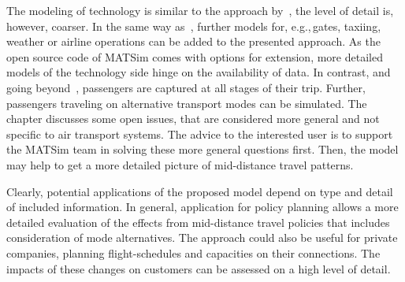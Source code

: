 The modeling of technology is similar to the approach by~\citet{ClarkeEtAl2007AirNetworkSim}, the level of detail is, however, coarser. 
In the same way as~\citet{ClarkeEtAl2007AirNetworkSim}, further models for, e.g.,\,gates, taxiing, weather or airline operations can be added to the presented approach. 
As the open source code of MATSim comes with options for extension, more detailed models of the technology side hinge on the availability of data. 
In contrast, and going beyond~\citet{ClarkeEtAl2007AirNetworkSim}, passengers are captured at all stages of their trip. 
Further, passengers traveling on alternative transport modes can be simulated. 
The chapter discusses some open issues, that are considered more general and not specific to air transport systems. 
The advice to the interested user is to support the MATSim team in solving these more general questions first.  
Then, the model may help to get a more detailed picture of mid-distance travel patterns.

Clearly, potential applications of the proposed model depend on type and detail of included information. 
In general, application for policy planning allows a more detailed evaluation of the effects from mid-distance travel policies that includes consideration of mode alternatives. 
The approach could also be useful for private companies, planning flight-schedules and capacities on their connections. 
The impacts of these changes on customers can be assessed on a high level of detail. 


